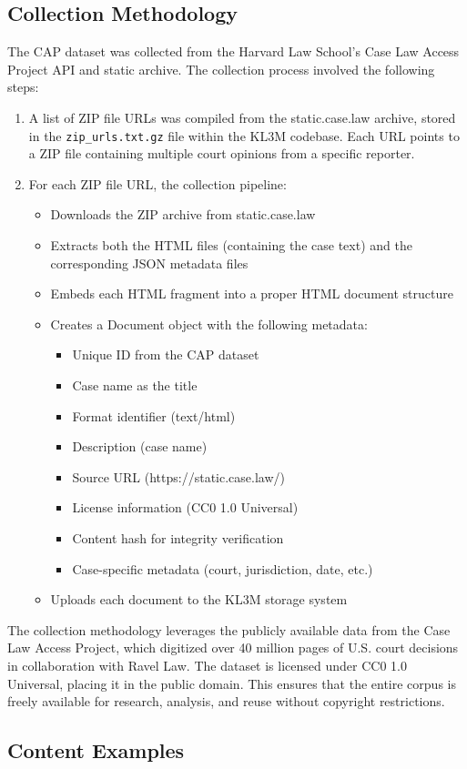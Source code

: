 \subsection{Collection Methodology}

The CAP dataset was collected from the Harvard Law School's Case Law Access Project API and static archive. The collection process involved the following steps:

\begin{enumerate}
  \item A list of ZIP file URLs was compiled from the static.case.law archive, stored in the \texttt{zip\_urls.txt.gz} file within the KL3M codebase. Each URL points to a ZIP file containing multiple court opinions from a specific reporter.
  
  \item For each ZIP file URL, the collection pipeline:
  \begin{itemize}
    \item Downloads the ZIP archive from static.case.law
    \item Extracts both the HTML files (containing the case text) and the corresponding JSON metadata files
    \item Embeds each HTML fragment into a proper HTML document structure
    \item Creates a Document object with the following metadata:
    \begin{itemize}
      \item Unique ID from the CAP dataset
      \item Case name as the title
      \item Format identifier (text/html)
      \item Description (case name)
      \item Source URL (https://static.case.law/)
      \item License information (CC0 1.0 Universal)
      \item Content hash for integrity verification
      \item Case-specific metadata (court, jurisdiction, date, etc.)
    \end{itemize}
    \item Uploads each document to the KL3M storage system
  \end{itemize}
\end{enumerate}

The collection methodology leverages the publicly available data from the Case Law Access Project, which digitized over 40 million pages of U.S. court decisions in collaboration with Ravel Law. The dataset is licensed under CC0 1.0 Universal, placing it in the public domain. This ensures that the entire corpus is freely available for research, analysis, and reuse without copyright restrictions.

\subsection{Content Examples}
